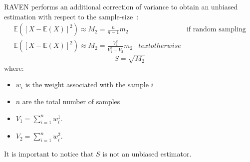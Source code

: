 RAVEN performs an additional correction of variance to obtain an unbiased estimation  with respect to the sample-size~\cite{RimoldiniUnbiased}:
\begin{equation}
\begin{matrix}
\mathbb{E}\left(\left[X - \mathbb{E}(X)\right]^{2}\right)  \approx M_{2} = \displaystyle \frac{n}{n-1}m_{2} & & \text{if random sampling}
\\
\mathbb{E}\left(\left[X - \mathbb{E}(X)\right]^{2}\right)  \approx M_{2} = \frac{V_{1}^{2}}{V_{1}^{2} - V_{2}}m_{2} &  text{otherwise}
\end{matrix}
\end{equation}
\begin{equation}
S = \sqrt{M_{2}}
\end{equation}
where:
\begin{itemize}
  \item $w_{i}$ is the weight associated with the sample $i$
  \item $n$ are the total number of samples
  \item $V_{1} = \sum_{i=1}^{n} w_{i}^{1}$.
  \item $V_{2} = \sum_{i=1}^{n} w_{i}^{2}$.
\end{itemize}
It is important to notice that $S$ is not an unbiased estimator.

